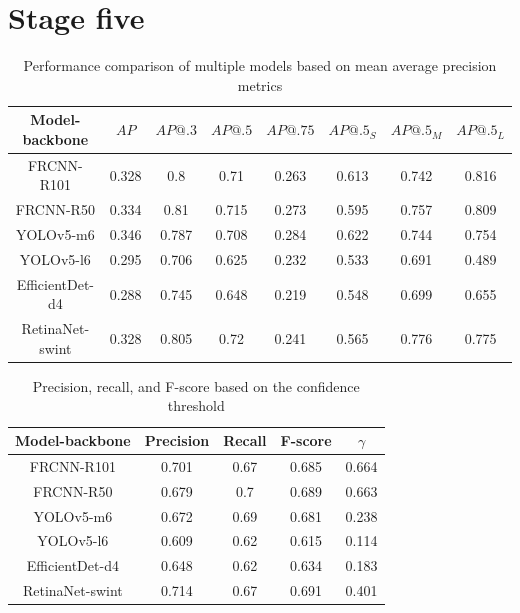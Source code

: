 \section{Stage five}

\begin{table}[H]
    \begin{tabular}{|c|c|c|c|c|c|c|c|}
        \hline
        Model-backbone  & $AP$  & $AP@.3$ & $AP@.5$ & $AP@.75$ & $AP@.5_S$ & $AP@.5_M$ & $AP@.5_L$ \\ \hline
        FRCNN-R101      & 0.328 & 0.8     & 0.71    & 0.263    & 0.613     & 0.742     & 0.816     \\ \hline
        FRCNN-R50       & 0.334 & 0.81    & 0.715   & 0.273    & 0.595     & 0.757     & 0.809     \\ \hline
        YOLOv5-m6       & 0.346 & 0.787   & 0.708   & 0.284    & 0.622     & 0.744     & 0.754     \\ \hline
        YOLOv5-l6       & 0.295 & 0.706   & 0.625   & 0.232    & 0.533     & 0.691     & 0.489     \\ \hline
        EfficientDet-d4 & 0.288 & 0.745   & 0.648   & 0.219    & 0.548     & 0.699     & 0.655     \\ \hline
        RetinaNet-swint & 0.328 & 0.805   & 0.72    & 0.241    & 0.565     & 0.776     & 0.775     \\ \hline
    \end{tabular}
    \caption{Performance comparison of multiple models based on mean average precision metrics}
    \label{tab:model_results:stage_five}
\end{table}

\begin{table}[H]
    \begin{tabular}{|c|c|c|c|c|}
        \hline
        Model-backbone  & Precision & Recall & F-score & $\gamma$ \\ \hline
        FRCNN-R101      & 0.701     & 0.67   & 0.685   & 0.664    \\ \hline
        FRCNN-R50       & 0.679     & 0.7    & 0.689   & 0.663    \\ \hline
        YOLOv5-m6       & 0.672     & 0.69   & 0.681   & 0.238    \\ \hline
        YOLOv5-l6       & 0.609     & 0.62   & 0.615   & 0.114    \\ \hline
        EfficientDet-d4 & 0.648     & 0.62   & 0.634   & 0.183    \\ \hline
        RetinaNet-swint & 0.714     & 0.67   & 0.691   & 0.401    \\ \hline
    \end{tabular}
    \caption{Precision, recall, and F-score based on the confidence threshold}
    \label{tab:model_prf:stage_five}
\end{table}

